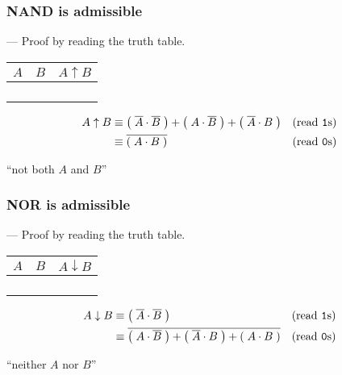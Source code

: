\begin{frame}

\frametitle{NAND is admissible}

\begin{flushright}
--- Proof by reading the truth table.
\end{flushright}

\begin{center}

\begin{tabular}{cc|>{\centering\arraybackslash}p{0.4in}}
$A$ & $B$ & $A \uparrow B$ \\\hline
\bz{} & \bz{} & \bo{} \\
\bz{} & \bo{} & \bo{} \\
\bo{} & \bz{} & \bo{} \\
\bo{} & \bo{} & \bz{}
\end{tabular}

\vspace{\fill}

\begin{align*}
A \uparrow B %
&\equiv \p{\overline{A} \cdot \overline{B}} + \p{A \cdot \overline{B}} + \p{\overline{A} \cdot B} %
& \text{(read \texttt{1}s)}\\
&\equiv \overline{\p{A\cdot B}} & \text{(read \texttt{0}s)}
\end{align*}

``not both $A$ and $B$''

\end{center}

\end{frame}

\begin{frame}

\frametitle{NOR is admissible}

\begin{flushright}
--- Proof by reading the truth table.
\end{flushright}

\begin{center}

\begin{tabular}{cc|>{\centering\arraybackslash}p{0.4in}}
$A$ & $B$ & $A \downarrow B$ \\\hline
\bz{} & \bz{} & \bo{} \\
\bz{} & \bo{} & \bz{} \\
\bo{} & \bz{} & \bz{} \\
\bo{} & \bo{} & \bz{}
\end{tabular}

\vspace{\fill}

\begin{align*}
A \downarrow B %
&\equiv \p{\overline{A} \cdot \overline{B}} & \text{(read \texttt{1}s)}\\
&\equiv \overline{\p{A \cdot \overline{B}} + \p{\overline{A} \cdot B} + \p{A \cdot B}}%
& \text{(read \texttt{0}s)}
\end{align*}

``neither $A$ nor $B$''

\end{center}

\end{frame}
